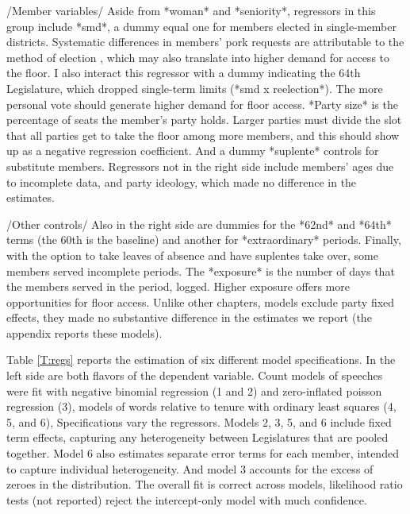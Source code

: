 \documentclass[letter,12pt]{article}
\begin{document}
/Member variables/ Aside from *woman* and *seniority*, regressors in this group include *smd*, a dummy equal one for members elected in single-member districts. Systematic differences in members' pork requests are attributable to the method of election \citep{kerevelPork2015}, which may also translate into higher demand for access to the floor. I also interact this regressor with a dummy indicating the 64th Legislature, which dropped single-term limits (*smd x reelection*). The more personal vote should generate higher demand for floor access. *Party size* is the percentage of seats the member's party holds. Larger parties must divide the slot that all parties get to take the floor among more members, and this should show up as a negative regression coefficient. And a dummy *suplente* controls for substitute members. Regressors not in the right side include members' ages due to incomplete data, and party ideology, which made no difference in the estimates.

/Other controls/ Also in the right side are dummies for the *62nd* and *64th* terms (the 60th is the baseline) and another for *extraordinary* periods. Finally, with the option to take leaves of absence and have suplentes take over, some members served incomplete periods. The *exposure* is the number of days that the members served in the period, logged. Higher exposure offers more opportunities for floor access. Unlike other chapters, models exclude party fixed effects, they made no substantive difference in the estimates we report (the appendix reports these models).


Table \ref{T:regs} reports the estimation of six different model specifications. In the left side are both flavors of the dependent variable. Count models of speeches were fit with negative binomial regression (1 and 2) and zero-inflated poisson regression (3), models of words relative to tenure with ordinary least squares (4, 5, and 6), Specifications vary the regressors. Models 2, 3, 5, and 6 include fixed term effects, capturing any heterogeneity between Legislatures that are pooled together. Model 6 also estimates separate error terms for each member, intended to capture individual heterogeneity. And model 3 accounts for the excess of zeroes in the distribution. The overall fit is correct across models, likelihood ratio tests (not reported) reject the intercept-only model with much confidence.
\end{document}
